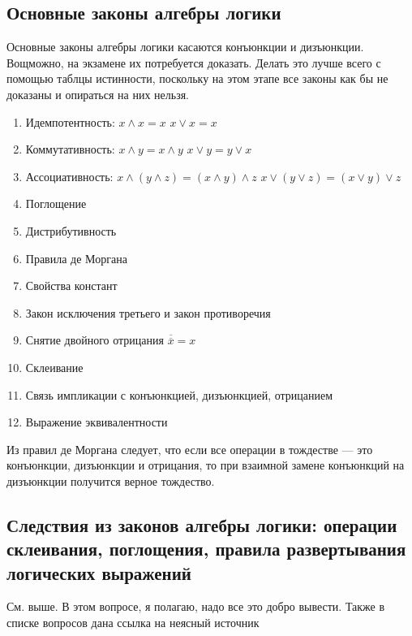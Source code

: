 \documentclass[14pt, a4paper]{extarticle}
\begin{document}
\subsection{Основные законы алгебры логики}
Основные законы алгебры логики касаются конъюнкции и дизъюнкции. Вощможно, на экзамене их потребуется доказать. Делать это лучше всего с помощью таблцы истинности, поскольку на этом этапе все законы как бы не доказаны и опираться на них нельзя.
\begin{enumerate}
  \item Идемпотентность: $x \land x = x$ \hspace{2cm} $x \lor x = x$
  \item Коммутативность: $x \land y = x \land y$ \hspace{2cm} $x \lor y = y \lor x$
  \item Ассоциативность: $x \land (y \land z) = (x \land y) \land z$ \hspace{1cm} $x \lor (y \lor z) = (x \lor y) \lor z$
  \item Поглощение
  \item Дистрибутивность
  \item Правила де Моргана
  \item Свойства констант
  \item Закон исключения третьего и закон противоречия
  \item Снятие двойного отрицания $\overline{\overline{x}} = x$
  \item Склеивание
  \item Связь импликации с конъюнкцией, дизъюнкцией, отрицанием
  \item Выражение эквивалентности
\end{enumerate}
Из правил де Моргана следует, что если все операции в тождестве --- это конъюнкции, дизъюнкции и отрицания, то при взаимной замене конъюнкций на дизъюнкции получится верное тождество.
\subsection{Следствия из законов алгебры логики: операции склеивания, поглощения, правила развертывания логических выражений}
См. выше. В этом вопросе, я полагаю, надо все это добро вывести. Также в списке вопросов дана ссылка на неясный источник
\end{document}
